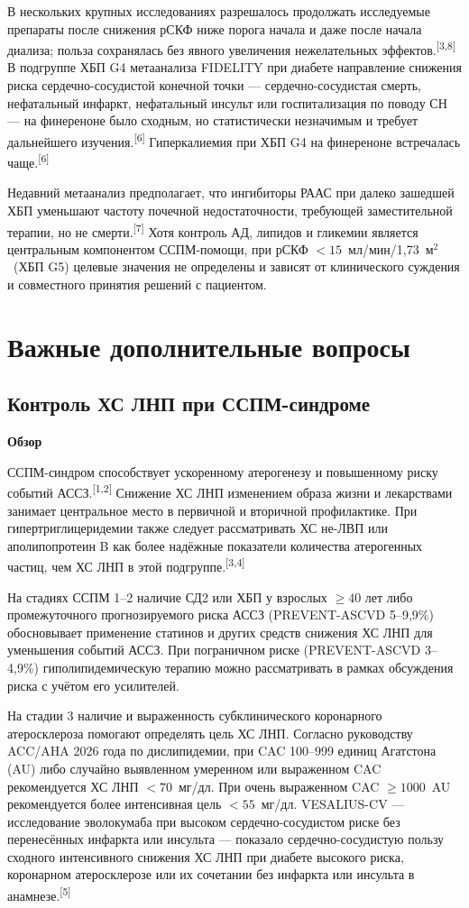 \documentclass[11pt,a4paper]{article}
\newcommand{\src}[1]{\textsuperscript{[#1]}}
\newcommand{\heading}[1]{\par\medskip\textbf{#1}\par}
\newcommand{\unitgfr}{мл/мин/1,73~м$^2$}
\begin{document}
В нескольких крупных исследованиях разрешалось продолжать исследуемые препараты после снижения рСКФ ниже порога начала и даже после начала диализа; польза сохранялась без явного увеличения нежелательных эффектов.\src{3,8} В подгруппе ХБП G4 метаанализа FIDELITY при диабете направление снижения риска сердечно-сосудистой конечной точки --- сердечно-сосудистая смерть, нефатальный инфаркт, нефатальный инсульт или госпитализация по поводу СН --- на финереноне было сходным, но статистически незначимым и требует дальнейшего изучения.\src{6} Гиперкалиемия при ХБП G4 на финереноне встречалась чаще.\src{6}

Недавний метаанализ предполагает, что ингибиторы РААС при далеко зашедшей ХБП уменьшают частоту почечной недостаточности, требующей заместительной терапии, но не смерти.\src{7} Хотя контроль АД, липидов и гликемии является центральным компонентом ССПМ-помощи, при рСКФ $<15$~\unitgfr\ (ХБП G5) целевые значения не определены и зависят от клинического суждения и совместного принятия решений с пациентом.

\section{Важные дополнительные вопросы}
\subsection{Контроль ХС ЛНП при ССПМ-синдроме}
\heading{Обзор}
ССПМ-синдром способствует ускоренному атерогенезу и повышенному риску событий АССЗ.\src{1,2} Снижение ХС ЛНП изменением образа жизни и лекарствами занимает центральное место в первичной и вторичной профилактике. При гипертриглицеридемии также следует рассматривать ХС не-ЛВП или аполипопротеин B как более надёжные показатели количества атерогенных частиц, чем ХС ЛНП в этой подгруппе.\src{3,4}

На стадиях ССПМ 1--2 наличие СД2 или ХБП у взрослых $\geq40$ лет либо промежуточного прогнозируемого риска АССЗ (PREVENT-ASCVD 5--9,9\%) обосновывает применение статинов и других средств снижения ХС ЛНП для уменьшения событий АССЗ. При пограничном риске (PREVENT-ASCVD 3--4,9\%) гиполипидемическую терапию можно рассматривать в рамках обсуждения риска с учётом его усилителей.

На стадии 3 наличие и выраженность субклинического коронарного атеросклероза помогают определять цель ХС ЛНП. Согласно руководству ACC/AHA 2026 года по дислипидемии, при CAC 100--999 единиц Агатстона (AU) либо случайно выявленном умеренном или выраженном CAC рекомендуется ХС ЛНП $<70$~мг/дл. При очень выраженном CAC $\geq1000$~AU рекомендуется более интенсивная цель $<55$~мг/дл. VESALIUS-CV --- исследование эволокумаба при высоком сердечно-сосудистом риске без перенесённых инфаркта или инсульта --- показало сердечно-сосудистую пользу сходного интенсивного снижения ХС ЛНП при диабете высокого риска, коронарном атеросклерозе или их сочетании без инфаркта или инсульта в анамнезе.\src{5}
\end{document}

